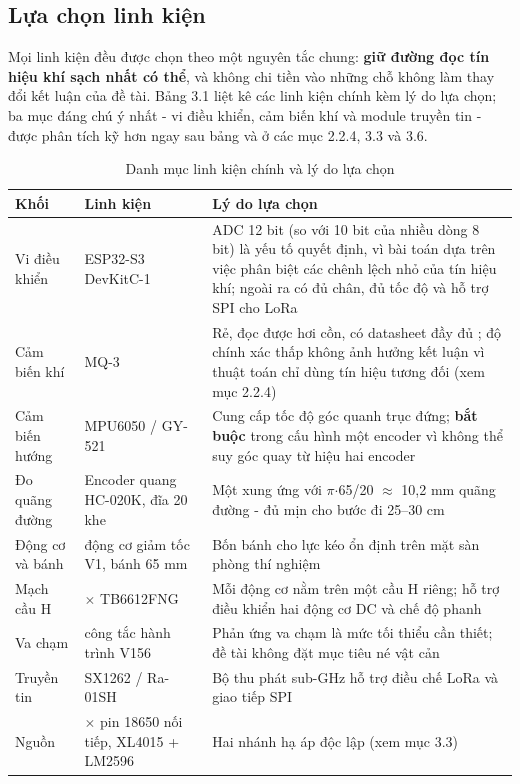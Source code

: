 \subsection{Lựa chọn linh kiện}
Mọi linh kiện đều được chọn theo một nguyên tắc chung: \textbf{giữ đường đọc tín hiệu khí sạch nhất có thể}, và không chi tiền vào những chỗ không làm thay đổi kết luận của đề tài. Bảng 3.1 liệt kê các linh kiện chính kèm lý do lựa chọn; ba mục đáng chú ý nhất - vi điều khiển, cảm biến khí và module truyền tin - được phân tích kỹ hơn ngay sau bảng và ở các mục 2.2.4, 3.3 và 3.6.

\begin{table}[!htbp]
  \centering
  \caption{Danh mục linh kiện chính và lý do lựa chọn}
  \small
  \renewcommand{\arraystretch}{1.25}
  \begin{tabular}{>{\raggedright\arraybackslash}p{}>{\raggedright\arraybackslash}p{}>{\raggedright\arraybackslash}p{}}
    \toprule
    \textbf{Khối} & \textbf{Linh kiện} & \textbf{Lý do lựa chọn} \\
    \midrule
    Vi điều khiển & ESP32-S3 DevKitC-1 & ADC 12 bit (so với 10 bit của nhiều dòng 8 bit) là yếu tố quyết định, vì bài toán dựa trên việc phân biệt các chênh lệch nhỏ của tín hiệu khí; ngoài ra có đủ chân, đủ tốc độ và hỗ trợ SPI cho LoRa \cite{r9} \\
    Cảm biến khí & MQ-3 & Rẻ, đọc được hơi cồn, có datasheet đầy đủ \cite{r7}; độ chính xác thấp không ảnh hưởng kết luận vì thuật toán chỉ dùng tín hiệu tương đối (xem mục 2.2.4) \\
    Cảm biến hướng & MPU6050 / GY-521 & Cung cấp tốc độ góc quanh trục đứng; \textbf{bắt buộc} trong cấu hình một encoder vì không thể suy góc quay từ hiệu hai encoder \\
    Đo quãng đường & Encoder quang HC-020K, đĩa 20 khe & Một xung ứng với $\pi$$\cdot$65/20 $\approx$ 10,2 mm quãng đường - đủ mịn cho bước đi 25--30 cm \\
    Động cơ và bánh & 4 động cơ giảm tốc V1, bánh 65 mm & Bốn bánh cho lực kéo ổn định trên mặt sàn phòng thí nghiệm \\
    Mạch cầu H & 2 $\times$ TB6612FNG & Mỗi động cơ nằm trên một cầu H riêng; hỗ trợ điều khiển hai động cơ DC và chế độ phanh \cite{r8} \\
    Va chạm & 1 công tắc hành trình V156 & Phản ứng va chạm là mức tối thiểu cần thiết; đề tài không đặt mục tiêu né vật cản \\
    Truyền tin & SX1262 / Ra-01SH & Bộ thu phát sub-GHz hỗ trợ điều chế LoRa và giao tiếp SPI \cite{r10} \\
    Nguồn & 2 $\times$ pin 18650 nối tiếp, XL4015 + LM2596 & Hai nhánh hạ áp độc lập (xem mục 3.3) \\
    \bottomrule
  \end{tabular}
\end{table}

